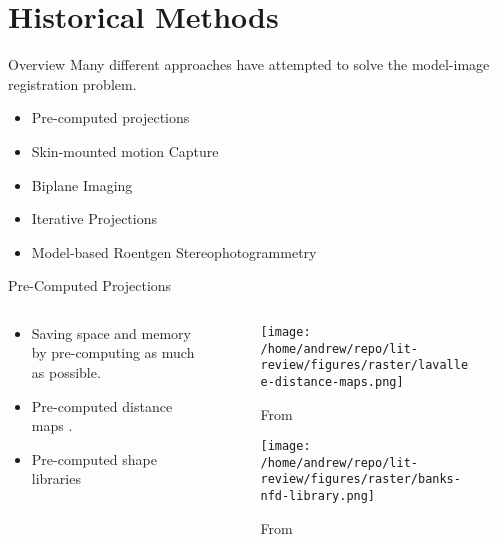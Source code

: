 \documentclass[presentation, aspectratio=1610]{beamer}
\begin{document}
\section{Historical Methods}
\label{sec:org733ecda}
\begin{frame}[label={sec:org0db7101}]{Overview}
Many different approaches have attempted to solve the model-image registration problem.
\begin{itemize}
\item Pre-computed projections
\item Skin-mounted motion Capture
\item Biplane Imaging
\item Iterative Projections
\item Model-based Roentgen Stereophotogrammetry
\end{itemize}
\end{frame}
\begin{frame}[label={sec:org9ef2007}]{Pre-Computed Projections}
\begin{columns}
\begin{column}{0.5\columnwidth}
\begin{itemize}
\item Saving space and memory by pre-computing as much as possible.
\item Pre-computed distance maps \autocites{zuffiModelbasedMethodReconstruction1999}[][]{lavalleeRecoveringPositionOrientation1995}.
\item Pre-computed shape libraries \autocite{banksAccurateMeasurementThreedimensional1996}
\end{itemize}
\end{column}
\begin{column}{0.6\columnwidth}
\begin{figure}[htbp]
\centering
\texttt{[image: /home/andrew/repo/lit-review/figures/raster/lavallee-distance-maps.png]}
\caption{From \autocite{lavalleeRecoveringPositionOrientation1995}}
\end{figure}
\vspace{-0.25in}
\begin{figure}[htbp]
\centering
\texttt{[image: /home/andrew/repo/lit-review/figures/raster/banks-nfd-library.png]}
\caption{From \autocite{banksAccurateMeasurementThreedimensional1996}}
\end{figure}
\end{column}
\end{columns}
\end{frame}
\end{document}
